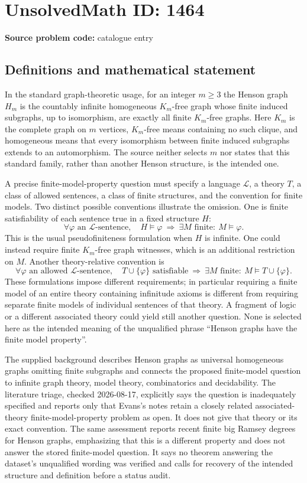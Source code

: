 \documentclass[11pt]{article}
\begin{document}
\section*{UnsolvedMath ID: 1464}
\textbf{Source problem code:} catalogue entry
\subsection{Definitions and mathematical statement}
In the standard graph-theoretic usage, for an integer $m\geq3$ the Henson graph $H_m$ is the countably infinite homogeneous $K_m$-free graph whose finite induced subgraphs, up to isomorphism, are exactly all finite $K_m$-free graphs. Here $K_m$ is the complete graph on $m$ vertices, $K_m$-free means containing no such clique, and homogeneous means that every isomorphism between finite induced subgraphs extends to an automorphism. The source neither selects $m$ nor states that this standard family, rather than another Henson structure, is the intended one.

A precise finite-model-property question must specify a language $\mathcal L$, a theory $T$, a class of allowed sentences, a class of finite structures, and the convention for finite models. Two distinct possible conventions illustrate the omission. One is finite satisfiability of each sentence true in a fixed structure $H$:
\[
\forall\varphi\text{ an }\mathcal L\text{-sentence},\quad
H\models\varphi\ \Longrightarrow\ 
\exists M\text{ finite}:\ M\models\varphi.
\]
This is the usual pseudofiniteness formulation when $H$ is infinite. One could instead require finite $K_m$-free graph witnesses, which is an additional restriction on $M$. Another theory-relative convention is
\[
\forall\varphi\text{ an allowed }\mathcal L\text{-sentence},\quad
T\cup\{\varphi\}\text{ satisfiable}\ \Longrightarrow\ 
\exists M\text{ finite}:\ M\models T\cup\{\varphi\}.
\]
These formulations impose different requirements; in particular requiring a finite model of an entire theory containing infinitude axioms is different from requiring separate finite models of individual sentences of that theory. A fragment of logic or a different associated theory could yield still another question. None is selected here as the intended meaning of the unqualified phrase ``Henson graphs have the finite model property''.

The supplied background describes Henson graphs as universal homogeneous graphs omitting finite subgraphs and connects the proposed finite-model question to infinite graph theory, model theory, combinatorics and decidability. The literature triage, checked 2026-08-17, explicitly says the question is inadequately specified and reports only that Evans's notes retain a closely related associated-theory finite-model-property problem as open. It does not give that theory or its exact convention. The same assessment reports recent finite big Ramsey degrees for Henson graphs, emphasizing that this is a different property and does not answer the stored finite-model question. It says no theorem answering the dataset's unqualified wording was verified and calls for recovery of the intended structure and definition before a status audit.
\end{document}
